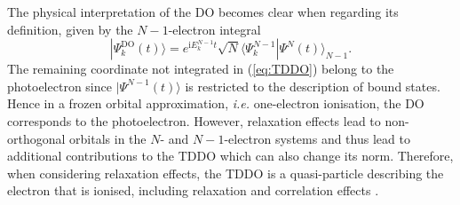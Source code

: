 The physical interpretation of the DO becomes clear when regarding its definition, given by the $N-1$-electron integral
\begin{equation} \label{eq:TDDO}
|\Psi_k^\text{DO}(t)\rangle =  e^{\text{i}E_k^{N-1}t}\sqrt{N} \langle \Psi_k^{N-1} |\Psi^N(t) \rangle_{N-1}.
\end{equation}
The remaining coordinate not integrated in (\ref{eq:TDDO}) belong to the photoelectron since $|\Psi^{N-1}(t)\rangle$ is restricted to the description of bound states.
Hence in a frozen orbital approximation, \textit{i.e.} one-electron ionisation, the DO corresponds to the photoelectron.
However, relaxation effects lead to non-orthogonal orbitals in the $N$- and $N-1$-electron systems and thus lead to additional contributions to the TDDO which can also change its norm.
Therefore, when considering relaxation effects, the TDDO is a quasi-particle describing the electron that is ionised, including relaxation and correlation effects \cite{ezDyson,TD-do}.


